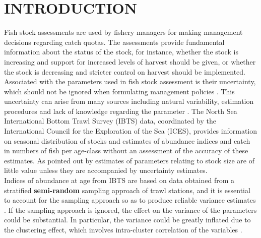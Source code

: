 \documentclass[a4paper 12pt]{article}
\numberwithin{equation}{section}
\begin{document}
\begin{abstract}



\end{abstract}


\clearpage
\section{\large INTRODUCTION}
Fish stock assessments are used by fishery managers for making management decisions regarding catch quotas. The assessments provide fundamental information about the status of the stock, for instance, whether the stock is increasing and support for increased levels of harvest should be given, or whether the stock is decreasing and stricter control on harvest should be implemented. Associated with the parameters used in fish stock assessment is their uncertainty, which should not be ignored when formulating management policies \citep{walters1981effects, ludwig1981measurement}. This uncertainty can arise from many sources including natural variability, estimation procedures and lack of knowledge regarding the parameter \citep{ehrhardt1997role}. The North Sea International Bottom Trawl Survey (IBTS) data, coordinated by the International Council for the Exploration of the Sea (ICES), provides information on seasonal distribution of stocks and estimates of abundance indices and catch in numbers of fish per age-class without an assessment of the accuracy of these estimates.  As pointed out by  \citet{ludwig1981measurement} estimates of parameters relating to stock size are of little value unless they are accompanied by uncertainty estimates. \\
\indent Indices of abundance at age from IBTS  are based on data obtained from a stratified {\bf semi-random} sampling approach of trawl stations,  and  it is essential to account for the sampling approach so as to produce reliable variance estimates \citep{lehtonen2004practical}. If the sampling approach is ignored, the effect on the variance  of the parameters could be substantial.  In particular, the variance could be greatly inflated  due to the clustering effect, which involves intra-cluster correlation of the variables \citep{aanes2015efficient, lehtonen2004practical}. 
\end{document}
